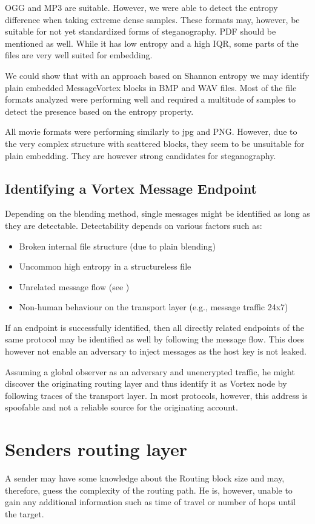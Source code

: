 OGG and MP3 are suitable. However, we were able to detect the entropy difference when taking extreme dense samples. These formats may, however, be suitable for not yet standardized forms of steganography. PDF should be mentioned as well. While it has low entropy and a high IQR, some parts of the files are very well suited for embedding.

We could show that with an approach based on Shannon entropy we may identify plain embedded MessageVortex blocks in BMP and WAV files. Most of the file formats analyzed were performing well and required a multitude of samples to detect the presence based on the entropy property.

All movie formats were performing similarly to jpg and PNG. However, due to the very complex structure with scattered blocks, they seem to be unsuitable for plain embedding. They are however strong candidates for steganography.

\subsection{Identifying a Vortex Message Endpoint}
Depending on the blending method, single messages might be identified as long as they are detectable. Detectability depends on various factors such as:

\begin{itemize}
	\item Broken internal file structure (due to plain blending)
	\item Uncommon high entropy in a structureless file
	\item Unrelated message flow (see \cite{oakland2013-parrot})
	\item Non-human behaviour on the transport layer (e.g., message traffic 24x7)
\end{itemize}

If an endpoint is successfully identified, then all directly related endpoints of the same protocol may be identified as well by following the message flow. This does however not enable an adversary to inject messages as the host key is not leaked. 

Assuming a global observer as an adversary and unencrypted traffic, he might discover the originating routing layer and thus identify it as Vortex node by following traces of the transport layer. In most protocols, however, this address is spoofable and not a reliable source for the originating account.

\section{Senders routing layer}
A sender may have some knowledge about the Routing block size and may, therefore, guess the complexity of the routing path. He is, however, unable to gain any additional information such as time of travel or number of hops until the target.

